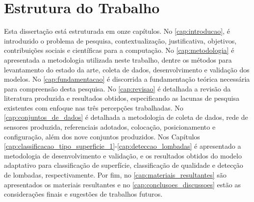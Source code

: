 \section{Estrutura do Trabalho}

Esta dissertação está estruturada em onze capítulos. No \autoref{cap:introducao}, é introduzido o problema de pesquisa, contextualização, justificativa, objetivos, contribuições sociais e científicas para a computação. No \autoref{cap:metodologia} é apresentada a metodologia utilizada neste trabalho, dentre os métodos para levantamento do estado da arte, coleta de dados, desenvolvimento e validação dos modelos. No \autoref{cap:fundamentacao} é discorrida a fundamentação teórica necessária para compreensão desta pesquisa. No \autoref{cap:revisao} é detalhada a revisão da literatura produzida e resultados obtidos, especificando as lacunas de pesquisa existentes com enfoque nas três percepções trabalhadas. No \autoref{cap:conjuntos_de_dados} é detalhada a metodologia de coleta de dados, rede de sensores produzida, referenciais adotados, colocação, posicionamento e configuração, além dos nove conjuntos produzidos. Nos Capítulos \ref{cap:classificacao_tipo_superficie_1}-\ref{cap:deteccao_lombadas} é apresentado a metodologia de desenvolvimento e validação, e os resultados obtidos do modelo adaptativo para classificação de superfície, classificação de qualidade e detecção de lombadas, respectivamente. Por fim, no \autoref{cap:materiais_resultantes} são apresentados os materiais resultantes e no \autoref{cap:conclusoes_discussoes} estão as considerações finais e sugestões de trabalhos futuros.
